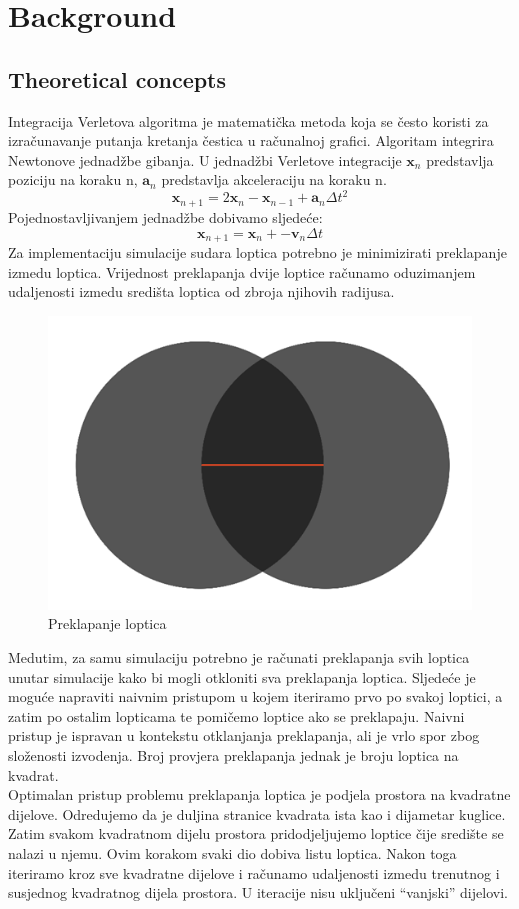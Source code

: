 \documentclass[conference]{IEEEtran}
\begin{document}
\section{Background}
\subsection{Theoretical concepts}
Integracija Verletova algoritma je matematička metoda koja se često koristi za izračunavanje putanja kretanja čestica u računalnoj grafici. Algoritam integrira Newtonove jednadžbe gibanja.
U jednadžbi Verletove integracije  \( \mathbf{x}_n \) predstavlja poziciju na koraku n,  \( \mathbf{a}_n \) predstavlja akceleraciju na koraku n.
\[
\mathbf{x}_{n+1} = 2\mathbf{x}_n - \mathbf{x}_{n-1} + \mathbf{a}_n \Delta t^2
\]
Pojednostavljivanjem jednadžbe dobivamo sljedeće:
\[
\mathbf{x}_{n+1} = \mathbf{x}_n + - \mathbf{v}_{n}\Delta t 
\]
Za implementaciju simulacije sudara loptica potrebno je minimizirati preklapanje izmedu loptica. Vrijednost preklapanja dvije loptice računamo oduzimanjem udaljenosti izmedu središta loptica od zbroja njihovih radijusa.

\begin{figure}
    \centering
    \includegraphics[width=0.5\linewidth]{image.png}
    \caption{Preklapanje loptica}
    \label{fig:enter-label}
\end{figure}

 Medutim, za samu simulaciju potrebno je računati preklapanja svih loptica unutar simulacije kako bi mogli otkloniti sva preklapanja loptica. Sljedeće je moguće napraviti naivnim pristupom u kojem iteriramo prvo po svakoj loptici, a zatim po ostalim lopticama te pomičemo loptice ako se preklapaju. Naivni pristup je ispravan u kontekstu otklanjanja preklapanja, ali je vrlo spor zbog složenosti izvodenja. Broj provjera preklapanja jednak je broju loptica na kvadrat. \\ 
Optimalan pristup problemu preklapanja loptica je podjela prostora na kvadratne dijelove. Odredujemo da je duljina stranice kvadrata ista kao i dijametar kuglice. Zatim svakom kvadratnom dijelu prostora pridodjeljujemo loptice čije središte se nalazi u njemu. Ovim korakom svaki dio dobiva listu loptica. Nakon toga iteriramo kroz sve kvadratne dijelove i računamo udaljenosti izmedu trenutnog i susjednog kvadratnog dijela prostora. U iteracije nisu uključeni “vanjski” dijelovi.
\end{document}
